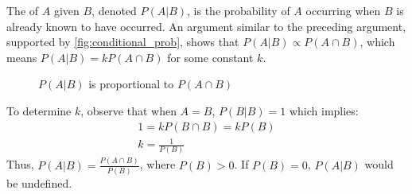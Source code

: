 The  of \( A \) given \( B \), denoted \( P(A | B) \), is the probability of \( A \) occurring when \( B \) is already known to have occurred.
An argument similar to the preceding argument, supported by \autoref{fig:conditional_prob}, shows that \( P(A | B) \propto P(A \cap B) \), which means \( P(A | B) = kP(A \cap B) \) for some constant \( k \).
\begin{figure}[t]
\begin{center}
\end{center}
\caption{\( P(A | B) \) is proportional to \( P(A \cap B) \)}
\label{fig:conditional_prob}
\end{figure}
To determine \( k \), observe that when \( A = B \), \( P(B | B) = 1 \) which implies:
\begin{gather*}
	1 = kP(B \cap B) = kP(B)\\
	k = \frac{1}{P(B)}
\end{gather*}
Thus, \( P(A | B) = \frac{P(A \cap B)}{P(B)} \),
where \( P(B) > 0 \).
If \( P(B) = 0 \), \( P(A | B) \) would be undefined.


